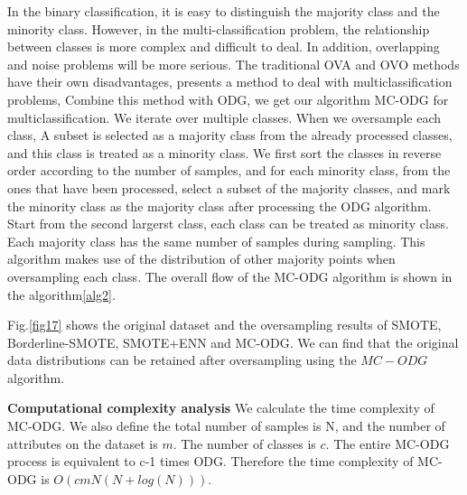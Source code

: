 \documentclass[ida]{iosart2x}
\begin{document}
 In the binary classification, 
it is easy to distinguish the majority class and the minority class. 
However, in the multi-classification problem, the relationship between
classes is more complex and difficult to deal.
In addition, overlapping and noise problems will be more serious.
The traditional OVA and OVO methods have their own disadvantages, 
\cite{2020Combined,2019Radial} presents a method to deal with multiclassification problems,
Combine this method with ODG, we get our algorithm MC-ODG for multiclassification.
We iterate over multiple classes. When we oversample each class,
A subset is selected as a majority class from the already processed classes, 
and this class is treated as a minority class.
We first sort the classes in reverse order according to the number of samples, and for each minority class, 
from the ones that have been processed,
select a subset of the majority classes, and mark the minority class as the majority class 
after processing the ODG algorithm.
Start from the second largerst class, each class can be treated as minority class.
Each majority class has the same number of samples during sampling.
This algorithm makes use of the distribution of 
other majority points when oversampling each class.
The overall flow of the MC-ODG algorithm is shown in the algorithm\ref{alg2}.


 Fig.\ref{fig17} shows the original dataset and the oversampling results of SMOTE, Borderline-SMOTE,
 SMOTE+ENN and MC-ODG. We can find that the original data distributions 
 can be retained after oversampling using the $MC-ODG$ algorithm.

 \textbf{Computational complexity analysis}
We calculate the time complexity of MC-ODG.
 We also define the total number of samples is N, and the number of attributes on the dataset is $m$.
 The number of classes is $c$. The entire MC-ODG process is equivalent to c-1 times ODG.
 Therefore the time complexity of MC-ODG is $O(cmN(N+log(N)))$.
\end{document}
